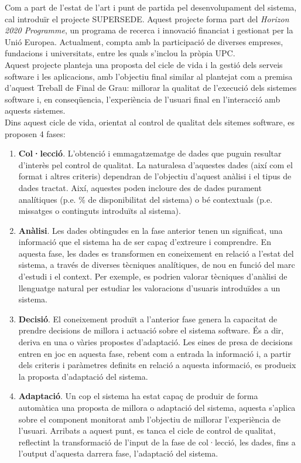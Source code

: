 Com a part de l'estat de l'art i punt de partida pel desenvolupament del sistema, cal introduïr el projecte SUPERSEDE\cite{supersede}. Aquest projecte forma part del \textit{Horizon 2020 Programme}\cite{horizon}, un programa de recerca i innovació financiat i gestionat per la Unió Europea. Actualment, compta amb la participació de diverses empreses, fundacions i universitats, entre les quals s'inclou la pròpia UPC. \\

Aquest projecte planteja una proposta del cicle de vida i la gestió dels serveis software i les aplicacions, amb l'objectiu final similar al plantejat com a premisa d'aquest Treball de Final de Grau: millorar la qualitat de l'execució dels sistemes software i, en conseqüencia, l'experiència de l'usuari final en l'interacció amb aquests sistemes. \\

Dins aquest cicle de vida, orientat al control de qualitat dels sitemes software, es proposen 4 fases:

\begin{enumerate}
\item \textbf{Col·lecció}. L'obtenció i emmagatzematge de dades que puguin resultar d'interès pel control de qualitat. La naturalesa d'aquestes dades (així com el format i altres criteris) dependran de l'objectiu d'aquest anàlisi i el tipus de dades tractat. Així, aquestes poden incloure des de dades purament analítiques (p.e. \% de disponibilitat del sistema) o bé contextuals (p.e. missatges o continguts introduïts al sistema).
\item \textbf{Anàlisi}. Les dades obtingudes en la fase anterior tenen un significat, una informació que el sistema ha de ser capaç d'extreure i comprendre. En aquesta fase, les dades es transformen en coneixement en relació a l'estat del sistema, a través de diverses tècniques analítiques, de nou en funció del marc d'estudi i el context. Per exemple, es podrien valorar tècniques d'anàlisi de llenguatge natural per estudiar les valoracions d'usuaris introduïdes a un sistema.
\item \textbf{Decisió}. El coneixement produït a l'anterior fase genera la capacitat de prendre decisions de millora i actuació sobre el sistema software. És a dir, deriva en una o vàries propostes d'adaptació. Les eines de presa de decisions entren en joc en aquesta fase, rebent com a entrada la informació i, a partir dels criteris i paràmetres definits en relació a aquesta informació, es produeix la proposta d'adaptació del sistema.
\item \textbf{Adaptació}. Un cop el sistema ha estat capaç de produir de forma automàtica una proposta de millora o adaptació del sistema, aquesta s'aplica sobre el component monitorat amb l'objectiu de millorar l'experiència de l'usuari. Arribats a aquest punt, es tanca el cicle de control de qualitat, reflectint la transformació de l'input de la fase de col·lecció, les dades, fins a l'output d'aquesta darrera fase, l'adaptació del sistema.
\end{enumerate}


